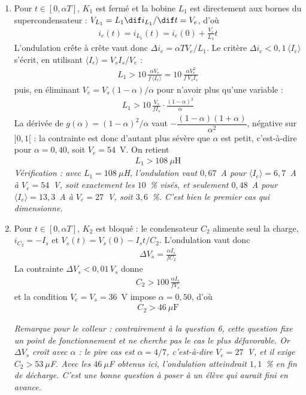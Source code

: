 \begin{correction}
\begin{enumerate}
        \item Pour $t\in[0,\alpha T]$, $K_1$ est fermé et la bobine $L_1$ est directement aux bornes du supercondensateur : $V_{L_1}=L_1\dif i_{L_1}/\dif t=V_e$, d'où
        \begin{align*}
            i_e(t)=i_{L_1}(t)=i_e(0)+\frac{V_e}{L_1}t
        \end{align*}
        L'ondulation crête à crête vaut donc $\Delta i_e=\alpha TV_e/L_1$. Le critère $\Delta i_e<0,1\,\langle I_e\rangle$ s'écrit, en utilisant $\langle I_e\rangle=V_sI_s/V_e$ :
        \begin{align*}
            L_1>10\,\frac{\alpha V_e}{f\,\langle I_e\rangle}=10\,\frac{\alpha V_e^2}{f\,V_sI_s}
        \end{align*}
        puis, en éliminant $V_e=V_s(1-\alpha)/\alpha$ pour n'avoir plus qu'une variable :
        \begin{align*}
            L_1>10\,\frac{V_s}{f I_s}\cdot\frac{(1-\alpha)^2}{\alpha}
        \end{align*}
        La dérivée de $g(\alpha)=(1-\alpha)^2/\alpha$ vaut $-\dfrac{(1-\alpha)(1+\alpha)}{\alpha^2}$, négative sur $]0,1[$ : la contrainte est donc d'autant plus sévère que $\alpha$ est petit, c'est-à-dire pour $\alpha=0,40$, soit $V_e=54$~V. On retient
        \begin{align*}
            \boxed{L_1>108~\mu\mathrm{H}}
        \end{align*}
        \textit{Vérification : avec $L_1=108~\mu$H, l'ondulation vaut $0,67$~A pour $\langle I_e\rangle=6,7$~A à $V_e=54$~V, soit exactement les $10$~\% visés, et seulement $0,48$~A pour $\langle I_e\rangle=13,3$~A à $V_e=27$~V, soit $3,6$~\%. C'est bien le premier cas qui dimensionne.}

        \item Pour $t\in[0,\alpha T]$, $K_2$ est bloqué : le condensateur $C_2$ alimente seul la charge, $i_{C_2}=-I_s$ et $V_s(t)=V_s(0)-I_st/C_2$. L'ondulation vaut donc
        \begin{align*}
            \Delta V_s = \frac{\alpha I_s}{fC_2}
        \end{align*}
        La contrainte $\Delta V_s<0,01\,V_s$ donne
        \begin{align*}
            C_2 > 100\,\frac{\alpha I_s}{f V_s}
        \end{align*}
        et la condition $V_e=V_s=36$~V impose $\alpha=0,50$, d'où
        \begin{align*}
            \boxed{C_2>46~\mu\mathrm{F}}
        \end{align*}

        \textit{Remarque pour le colleur : contrairement à la question 6, cette question fixe un point de fonctionnement et ne cherche pas le cas le plus défavorable. Or $\Delta V_s$ croît avec $\alpha$ : le pire cas est $\alpha=4/7$, c'est-à-dire $V_e=27$~V, et il exige $C_2>53~\mu$F. Avec les $46~\mu$F obtenus ici, l'ondulation atteindrait $1,1$~\% en fin de décharge. C'est une bonne question à poser à un élève qui aurait fini en avance.}

    \end{enumerate}

\end{correction}
